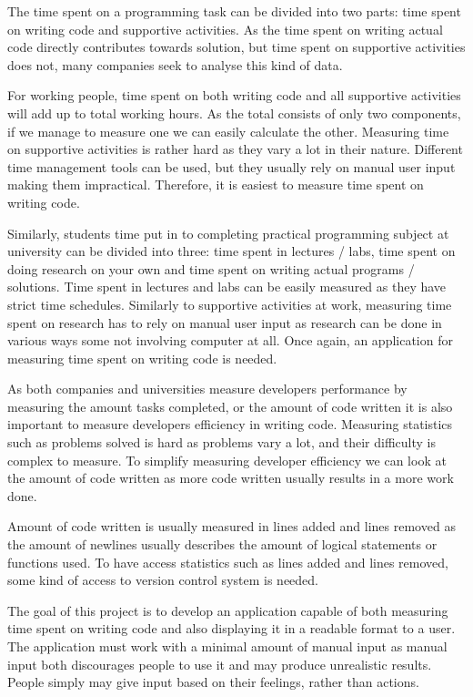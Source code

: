 The time spent on a programming task can be divided into two parts: time spent on writing code and supportive activities.
As the time spent on writing actual code directly contributes towards solution, but time spent on supportive activities does not,
many companies seek to analyse this kind of data.

For working people, time spent on both writing code and all supportive activities will add up to total working hours.
As the total consists of only two components, if we manage to measure one we can easily calculate the other.
Measuring time on supportive activities is rather hard as they vary a lot in their nature.
Different time management tools can be used, but they usually rely on manual user input making them impractical.
Therefore, it is easiest to measure time spent on writing code.

Similarly, students time put in to completing practical programming subject at university can be divided into three: time spent in lectures / labs,
time spent on doing research on your own and time spent on writing actual programs / solutions.
Time spent in lectures and labs can be easily measured as they have strict time schedules.
Similarly to supportive activities at work, measuring time spent on research has to rely on manual user input as research can be done in various ways some not involving computer at all.
Once again, an application for measuring time spent on writing code is needed.

As both companies and universities measure developers performance by measuring the amount tasks completed,
or the amount of code written it is also important to measure developers efficiency in writing code.
Measuring statistics such as problems solved is hard as problems vary a lot, and their difficulty is complex to measure.
To simplify measuring developer efficiency we can look at the amount of code written as more code written usually results in a more work done.

Amount of code written is usually measured in lines added and lines removed as the amount of newlines usually describes the amount
of logical statements or functions used.
To have access statistics such as lines added and lines removed, some kind of access to version control system is needed.

The goal of this project is to develop an application capable of both measuring time spent on writing code and also
displaying it in a readable format to a user.
The application must work with a minimal amount of manual input as manual input both discourages people to use it and may produce
unrealistic results.
People simply may give input based on their feelings, rather than actions.


